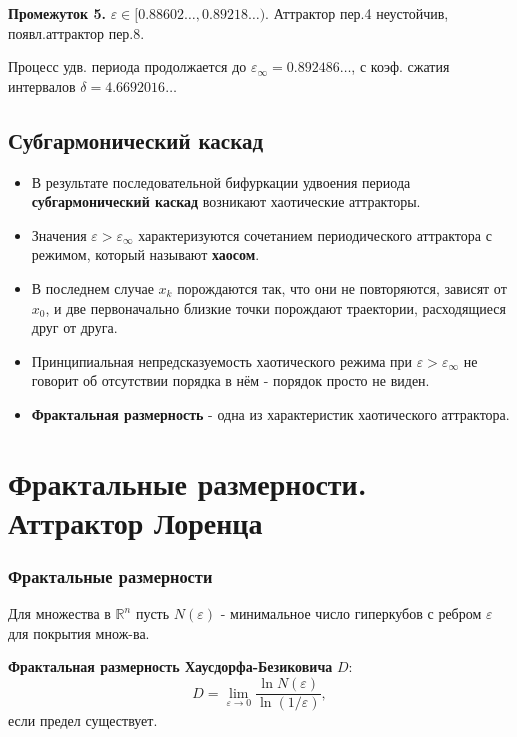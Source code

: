 	\textbf{Промежуток 5.} $\varepsilon \in [0.88602\ldots, 0.89218\ldots)$. Аттрактор пер.4 неустойчив, появл.аттрактор пер.8.
	
	Процесс удв. периода продолжается до $\varepsilon_\infty=0.892486\ldots$, с коэф. сжатия интервалов $\delta=4.6692016\ldots$
	
	\subsection{Субгармонический каскад}
	
	\begin{itemize}
		\item В результате последовательной бифуркации удвоения периода 
		\textbf{субгармонический каскад} возникают хаотические аттракторы.
		
		\item Значения \( \varepsilon > \varepsilon_{\infty} \) характеризуются сочетанием периодического аттрактора с режимом, который называют \textbf{хаосом}.
		
		\item В последнем случае \( x_k \) порождаются так, что они не повторяются, зависят от \( x_0 \), и две первоначально близкие точки порождают траектории, расходящиеся друг от друга.
		
		\item Принципиальная непредсказуемость хаотического режима при \( \varepsilon > \varepsilon_{\infty} \) не говорит об отсутствии порядка в нём - порядок просто не виден.
		
		\item \textbf{Фрактальная размерность} - одна из характеристик хаотического аттрактора.
	\end{itemize}
	
	\newpage
	
	\section{Фрактальные размерности. Аттрактор Лоренца}
	
	\subsubsection{Фрактальные размерности}
	
	Для множества в $\mathbb{R}^n$ пусть $N(\varepsilon)$ - минимальное число гиперкубов с ребром $\varepsilon$ для покрытия множ-ва. 
	\par
	\textbf{Фрактальная размерность Хаусдорфа-Безиковича}  $D$:
	\begin{equation}
		D = \lim_{\varepsilon \to 0} \frac{\ln N(\varepsilon)}{\ln (1 / \varepsilon)},
	\end{equation}
	если предел существует.
	
